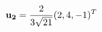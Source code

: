 \documentclass[preview]{standalone}
\begin{document}
\begin{align*}
\mathbf{u_2}    =   {2 \over 3 \sqrt{21  }}  (2, 4, -1)^T
\end{align*}
\end{document}
